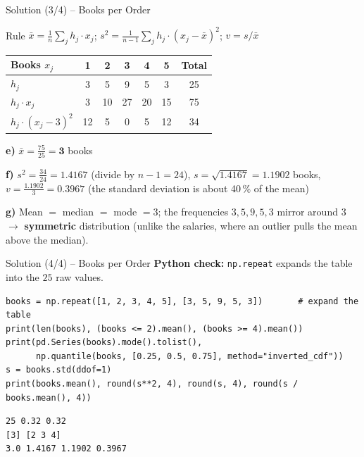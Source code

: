 \documentclass[aspectratio=169,11pt]{beamer}
\begin{document}
\begin{frame}{Solution (3/4) -- Books per Order}
  \begin{block}{Rule}
    $\bar{x} = \frac{1}{n}\sum_j h_j \cdot x_j$; \qquad $s^2 = \frac{1}{n-1}\sum_j h_j \cdot (x_j - \bar{x})^2$;
    \qquad $v = s / \bar{x}$
  \end{block}
  \begin{center}
    \renewcommand{\arraystretch}{1.2}
    \begin{tabular}{lcccccc}
      \toprule
      Books $x_j$ & 1 & 2 & 3 & 4 & 5 & Total \\
      \midrule
      $h_j$ & 3 & 5 & 9 & 5 & 3 & 25 \\
      $h_j \cdot x_j$ & 3 & 10 & 27 & 20 & 15 & 75 \\
      $h_j \cdot (x_j - 3)^2$ & 12 & 5 & 0 & 5 & 12 & 34 \\
      \bottomrule
    \end{tabular}
  \end{center}
  \textbf{e)} $\bar{x} = \frac{75}{25} = \mathbf{3}$ books

  \textbf{f)} $s^2 = \frac{34}{24} = \mathbf{1.4167}$ (divide by $n - 1 = 24$), \quad
  $s = \sqrt{1.4167} = \mathbf{1.1902}$ books,\\
  \hspace*{1.2em}$v = \frac{1.1902}{3} = \mathbf{0.3967}$ (the standard deviation is about 40\,\% of the mean)

  \textbf{g)} Mean $=$ median $=$ mode $= 3$; the frequencies $3, 5, 9, 5, 3$ mirror around $3$
  $\to$ \textbf{symmetric} distribution (unlike the salaries, where an outlier pulls the mean above the median).
\end{frame}

\begin{frame}[fragile]{Solution (4/4) -- Books per Order}
  \textbf{Python check:} \texttt{np.repeat} expands the table into the $25$ raw values.
\begin{lstlisting}
books = np.repeat([1, 2, 3, 4, 5], [3, 5, 9, 5, 3])       # expand the table
print(len(books), (books <= 2).mean(), (books >= 4).mean())
print(pd.Series(books).mode().tolist(),
      np.quantile(books, [0.25, 0.5, 0.75], method="inverted_cdf"))
s = books.std(ddof=1)
print(books.mean(), round(s**2, 4), round(s, 4), round(s / books.mean(), 4))
\end{lstlisting}
\begin{lstlisting}[style=Pyout]
25 0.32 0.32
[3] [2 3 4]
3.0 1.4167 1.1902 0.3967
\end{lstlisting}
\end{frame}
\end{document}

